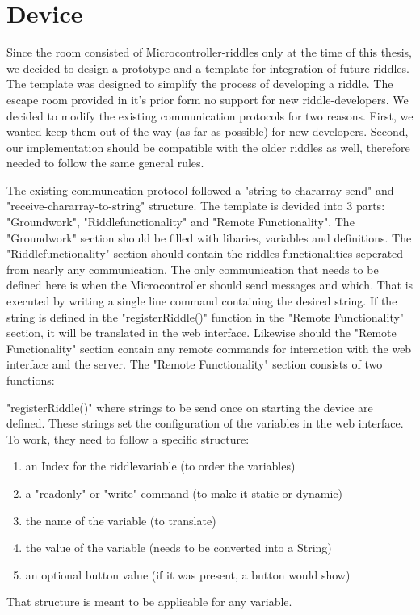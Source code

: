 \section{Device}
Since the room consisted of Microcontroller-riddles only at the time of this thesis, we decided to design a prototype and a template for integration of future riddles.
The template was designed to simplify the process of developing a riddle.
The escape room provided in it's prior form no support for new riddle-developers. 
We decided to modify the existing communication protocols for two reasons.
First, we wanted keep them out of the way (as far as possible) for new developers.
Second, our implementation should be compatible with the older riddles as well, therefore needed to follow the same general rules.

The existing communcation protocol followed a "string-to-chararray-send" and "receive-chararray-to-string" structure.
The template is devided into 3 parts: "Groundwork", "Riddlefunctionality" and "Remote Functionality". 
The "Groundwork" section should be filled with libaries, variables and definitions. 
The "Riddlefunctionality" section should contain the riddles functionalities seperated from nearly any communication. 
The only communication that needs to be defined here is when the Microcontroller should send messages and which. That is executed by writing a single line command containing the desired string.
If the string is defined in the "registerRiddle()" function in the "Remote Functionality" section, it will be translated in the web interface. 
Likewise should the "Remote Functionality" section contain any remote commands for interaction with the web interface and the server.
The "Remote Functionality" section consists of two functions: 

"registerRiddle()" where strings to be send once on starting the device are defined. 
These strings set the configuration of the variables in the web interface.
To work, they need to follow a specific structure:
\begin{enumerate}
    \item an Index for the riddlevariable (to order the variables)
    \item a "readonly" or "write" command (to make it static or dynamic)
    \item the name of the variable (to translate)
    \item the value of the variable (needs to be converted into a String)
    \item an optional button value (if it was present, a button would show)
\end{enumerate}
That structure is meant to be applieable for any variable. 

